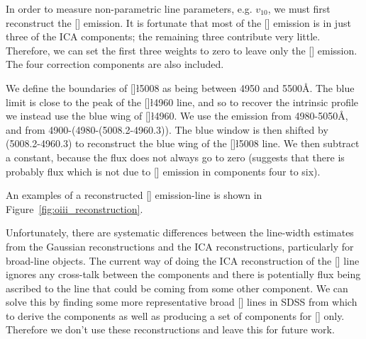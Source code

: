 In order to measure non-parametric line parameters, e.g. $v_{10}$, we must first reconstruct the [] emission. 
It is fortunate that most of the [] emission is in just three of the ICA components; the remaining three contribute very little. 
Therefore, we can set the first three weights to zero to leave only the [] emission. 
The four correction components are also included. 

We define the boundaries of []\l5008 as being between 4950 and 5500\AA. 
The blue limit is close to the peak of the []\l4960 line, and so to recover the intrinsic profile we instead use the blue wing of []\l4960. 
We use the emission from 4980-5050\AA, and from 4900-(4980-(5008.2-4960.3)). 
The blue window is then shifted by (5008.2-4960.3) to reconstruct the blue wing of the []\l5008 line. 
We then subtract a constant, because the flux does not always go to zero (suggests that there is probably flux which is not due to [] emission in components four to six). 

An examples of a reconstructed [] emission-line is shown in Figure~\ref{fig:oiii_reconstruction}. 

Unfortunately, there are systematic differences between the line-width estimates from the Gaussian reconstructions and the ICA reconstructions, particularly for broad-line objects.
The current way of doing the ICA reconstruction of the [] line ignores any cross-talk between the components and there is potentially flux being ascribed to the line that could be coming from some other component. 
We can solve this by finding some more representative broad [] lines in SDSS from which to derive the components as well as producing a set of components for [] only.
Therefore we don't use these reconstructions and leave this for future work. 

